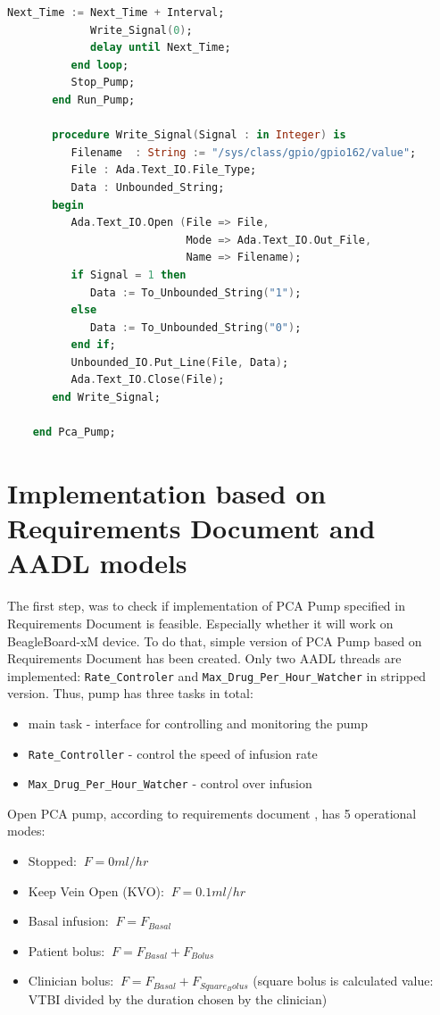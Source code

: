 \begin{lstlisting}[language=ada, frame=single, gobble=0, caption={Turning pin on and off}]
	         Next_Time := Next_Time + Interval;
	         Write_Signal(0);
	         delay until Next_Time;
	      end loop;
	      Stop_Pump;
	   end Run_Pump;

	   procedure Write_Signal(Signal : in Integer) is
	      Filename	: String := "/sys/class/gpio/gpio162/value";
	      File : Ada.Text_IO.File_Type;
	      Data : Unbounded_String;
	   begin
	      Ada.Text_IO.Open (File => File,
	                        Mode => Ada.Text_IO.Out_File,
	                        Name => Filename);
	      if Signal = 1 then
	         Data := To_Unbounded_String("1");
	      else
	         Data := To_Unbounded_String("0");
	      end if;
	      Unbounded_IO.Put_Line(File, Data);
	      Ada.Text_IO.Close(File);
	   end Write_Signal;

	end Pca_Pump;
\end{lstlisting} 
\label{listing:pca_basic}



\section{Implementation based on Requirements Document and AADL models}
\label{pcapumpimpl:manual}

The first step, was to check if implementation of PCA Pump specified in Requirements Document is feasible. Especially whether it will work on BeagleBoard-xM device. To do that, simple version of PCA Pump based on Requirements Document has been created. Only two AADL threads are implemented: \lstinline{Rate_Controler} and \lstinline{Max_Drug_Per_Hour_Watcher} in stripped version. Thus, pump has three tasks in total:
\begin{itemize}
    \item main task - interface for controlling and monitoring the pump
    \item \lstinline{Rate_Controller} - control the speed of infusion rate
    \item \lstinline{Max_Drug_Per_Hour_Watcher} - control over infusion
\end{itemize}

Open PCA pump, according to requirements document \cite{PcaReq}, has 5 operational modes:
\begin{itemize}
	\item Stopped: $\displaystyle\ F = 0 ml/hr$
	\item Keep Vein Open (KVO): $\displaystyle\ F = 0.1 ml/hr$
	\item Basal infusion: $\displaystyle\ F = F_{Basal}$
	\item Patient bolus: $\displaystyle\ F = F_{Basal} + F_{Bolus}$
	\item Clinician bolus: $\displaystyle\ F = F_{Basal} + F_{Square_Bolus}$ (square bolus is calculated value: VTBI divided by the duration chosen by the clinician)
\end{itemize}

